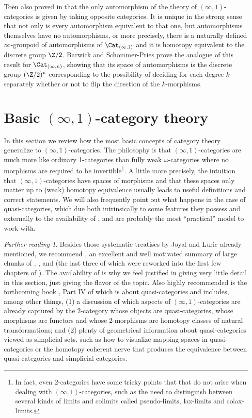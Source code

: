 \documentclass{conm-p-l}
\theoremstyle{definition} \newtheorem{definition}[theorem]{Definition}
\theoremstyle{remark} \newtheorem{remark}[theorem]{Remark}
\newtheorem*{further}{Further reading}
\numberwithin{equation}{section}
\newcommand{\oo}{\infty}
\newcommand{\io}{$(\oo,1)$}
\newcommand{\Catio}{\Cat_{(\oo,1)}}
\newcommand{\Catin}{\Cat_{(\oo,n)}}
\begin{document}
To\"{e}n also proved in \cite{ToenAx} that the only automorphism of
the theory of \io-categories is given by taking opposite categories.
It is unique in the strong sense that not only is every automorphism
equivalent to that one, but automorphisms themselves have no
automorphisms, or more precisely, there is a naturally defined
$\oo$-groupoid of automorphisms of $\Catio$ and it is homotopy
equivalent to the discrete group $\Z/2$. Barwick and Schommer-Pries
prove the analogue of this result for $\Catin$, showing that its
space of automorphisms is the discrete group $(\Z/2)^n$ corresponding
to the possibility of deciding for each degree $k$ separately whether
or not to flip the direction of the $k$-morphisms.

\section{Basic \io-category theory}

In this section we review how the most basic concepts of category
theory generalize to \io-categories. The philosophy is that
\io-categories are much more like ordinary 1-categories than fully
weak $\omega$-categories where no morphisms are required to be
invertible\footnote{In fact, even $2$-categories have some tricky
  points that that do not arise when dealing with \io-categories, such
  as the need to distinguish between several kinds of limits and
  colimits called pseudo-limits, lax-limits and colax-limits.}. A
little more precisely, the intuition that \io-categories have
spaces of morphisms and that these spaces only matter up to (weak)
homotopy equivalence usually leads to useful definitions and
correct statements. We will also frequently point out what happens in
the case of quasi-categories, which due both intrinsically to some
features they possess and externally to the availability of
\cite{Joyal}, \cite{HTT} and \cite{HA} are probably the most
``practical'' model to work with.

\begin{further} Besides those systematic treatises by Joyal and Lurie
already mentioned, we recommend \cite{Groth}, an excellent and well
motivated summary of large chunks of \cite{HTT}, \cite{DAG1},
\cite{DAG2} and \cite{DAG3} (the last three of which were reworked
into the first few chapters of \cite{HA}). The availability of
\cite{Groth} is why we feel justified in giving very little detail in
this section, just giving the flavor of the topic. Also highly
recommended is the forthcoming book \cite{Riehl}, Part IV of which is
about quasi-categories and includes, among other things, (1) a
discussion of which aspects of \io-categories are already captured by
the $2$-category whose objects are quasi-categories, whose morphisms
are functors and whose $2$-morphisms are homotopy classes of natural
transformations; and (2) plenty of geometrical information about
quasi-categories viewed as simplicial sets, such as how to visualize
mapping spaces in quasi-categories or the homotopy coherent nerve that
produces the equivalence between quasi-categories and simplicial
categories. \end{further}
\end{document}
